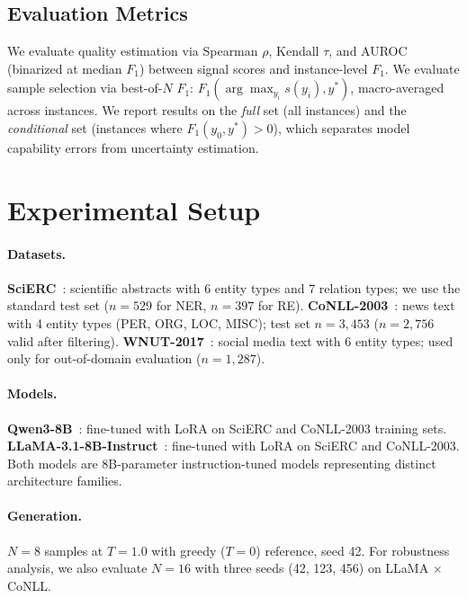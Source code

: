 \documentclass[11pt]{article}
\begin{document}
\subsection{Evaluation Metrics}

We evaluate quality estimation via Spearman $\rho$, Kendall $\tau$, and AUROC (binarized at median $F_1$) between signal scores and instance-level $F_1$.
We evaluate sample selection via best-of-$N$ $F_1$: $F_1(\arg\max_{y_i} s(y_i), y^*)$, macro-averaged across instances.
We report results on the \emph{full} set (all instances) and the \emph{conditional} set (instances where $F_1(y_0, y^*) > 0$), which separates model capability errors from uncertainty estimation.

\section{Experimental Setup}
\label{sec:setup}

\paragraph{Datasets.}
\textbf{SciERC}~\cite{luan2018multi}: scientific abstracts with 6 entity types and 7 relation types; we use the standard test set ($n{=}529$ for NER, $n{=}397$ for RE).
\textbf{CoNLL-2003}~\cite{conll2003}: news text with 4 entity types (PER, ORG, LOC, MISC); test set $n{=}3{,}453$ ($n{=}2{,}756$ valid after filtering).
\textbf{WNUT-2017}~\cite{derczynski2017wnut}: social media text with 6 entity types; used only for out-of-domain evaluation ($n{=}1{,}287$).

\paragraph{Models.}
\textbf{Qwen3-8B}~\cite{qwen2025}: fine-tuned with LoRA on SciERC and CoNLL-2003 training sets.
\textbf{LLaMA-3.1-8B-Instruct}~\cite{llama2024}: fine-tuned with LoRA on SciERC and CoNLL-2003.
Both models are 8B-parameter instruction-tuned models representing distinct architecture families.

\paragraph{Generation.}
$N{=}8$ samples at $T{=}1.0$ with greedy ($T{=}0$) reference, seed 42.
For robustness analysis, we also evaluate $N{=}16$ with three seeds (42, 123, 456) on LLaMA $\times$ CoNLL.
\end{document}
